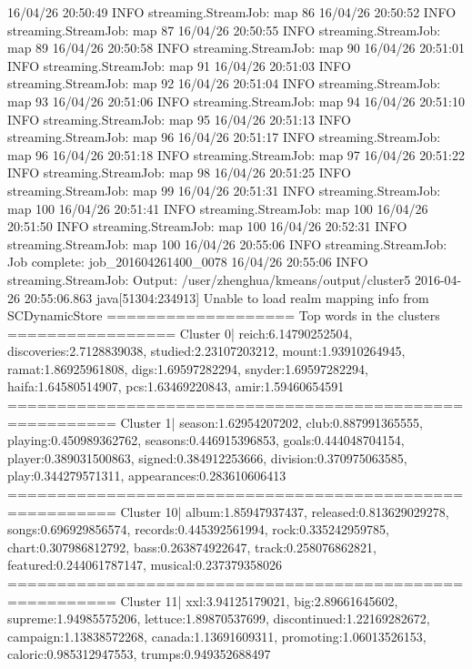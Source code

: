16/04/26 20:50:49 INFO streaming.StreamJob:  map 86%
16/04/26 20:50:52 INFO streaming.StreamJob:  map 87%
16/04/26 20:50:55 INFO streaming.StreamJob:  map 89%
16/04/26 20:50:58 INFO streaming.StreamJob:  map 90%
16/04/26 20:51:01 INFO streaming.StreamJob:  map 91%
16/04/26 20:51:03 INFO streaming.StreamJob:  map 92%
16/04/26 20:51:04 INFO streaming.StreamJob:  map 93%
16/04/26 20:51:06 INFO streaming.StreamJob:  map 94%
16/04/26 20:51:10 INFO streaming.StreamJob:  map 95%
16/04/26 20:51:13 INFO streaming.StreamJob:  map 96%
16/04/26 20:51:17 INFO streaming.StreamJob:  map 96%
16/04/26 20:51:18 INFO streaming.StreamJob:  map 97%
16/04/26 20:51:22 INFO streaming.StreamJob:  map 98%
16/04/26 20:51:25 INFO streaming.StreamJob:  map 99%
16/04/26 20:51:31 INFO streaming.StreamJob:  map 100%
16/04/26 20:51:41 INFO streaming.StreamJob:  map 100%
16/04/26 20:51:50 INFO streaming.StreamJob:  map 100%
16/04/26 20:52:31 INFO streaming.StreamJob:  map 100%
16/04/26 20:55:06 INFO streaming.StreamJob: Job complete: job_201604261400_0078
16/04/26 20:55:06 INFO streaming.StreamJob: Output: /user/zhenghua/kmeans/output/cluster5
2016-04-26 20:55:06.863 java[51304:234913] Unable to load realm mapping info from SCDynamicStore
=================== Top words in the clusters ================= 
Cluster 0| reich:6.14790252504, discoveries:2.7128839038, studied:2.23107203212, mount:1.93910264945, ramat:1.86925961808, digs:1.69597282294, snyder:1.69597282294, haifa:1.64580514907, pcs:1.63469220843, amir:1.59460654591
========================================================= 
Cluster 1| season:1.62954207202, club:0.887991365555, playing:0.450989362762, seasons:0.446915396853, goals:0.444048704154, player:0.389031500863, signed:0.384912253666, division:0.370975063585, play:0.344279571311, appearances:0.283610606413
========================================================= 
Cluster 10| album:1.85947937437, released:0.813629029278, songs:0.696929856574, records:0.445392561994, rock:0.335242959785, chart:0.307986812792, bass:0.263874922647, track:0.258076862821, featured:0.244061787147, musical:0.237379358026
========================================================= 
Cluster 11| xxl:3.94125179021, big:2.89661645602, supreme:1.94985575206, lettuce:1.89870537699, discontinued:1.22169282672, campaign:1.13838572268, canada:1.13691609311, promoting:1.06013526153, caloric:0.985312947553, trumps:0.949352688497

